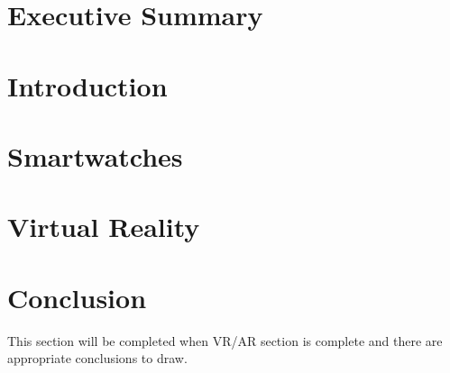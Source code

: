 \documentclass[12pt, titlepage, onecolumn]{article}
\begin{document}
\begin{titlepage}

\end{titlepage}
\frontmatter
\section*{Executive Summary}

\clearpage
\begin{singlespace}
\tableofcontents
\clearpage
\end{singlespace}
\clearpage
\setlength{\parindent}{0em}
\setlength{\parskip}{1em}
\mainmatter

\section{Introduction}


\clearpage
\section{Smartwatches}


\clearpage
\section{Virtual Reality}


\clearpage
\section{Conclusion}
This section will be completed when VR/AR section is complete and there are appropriate conclusions
to draw.
\clearpage
\backmatter
\begin{singlespace}


\clearpage
\end{singlespace}
\end{document}
